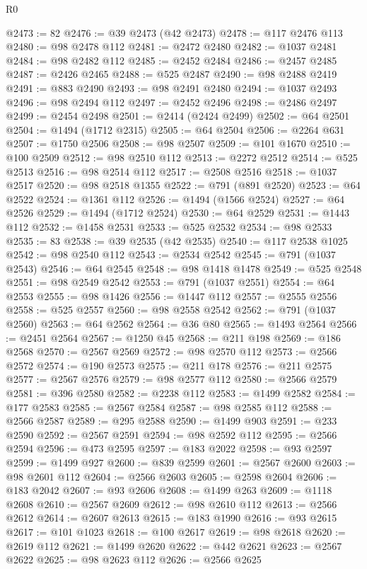 \begin{lexlean}{R0}
\begin{coremodule}
@2473 := 82
@2476 := @39 @2473 (@42 @2473)
@2478 := @117 @2476 @113
@2480 := @98 @2478 @112
@2481 := @2472 @2480
@2482 := @1037 @2481
@2484 := @98 @2482 @112
@2485 := @2452 @2484
@2486 := @2457 @2485
@2487 := @2426 @2465
@2488 := @525 @2487
@2490 := @98 @2488 @2419
@2491 := @883 @2490
@2493 := @98 @2491 @2480
@2494 := @1037 @2493
@2496 := @98 @2494 @112
@2497 := @2452 @2496
@2498 := @2486 @2497
@2499 := @2454 @2498
@2501 := @2414 (@2424 @2499)
@2502 := @64 @2501
@2504 := @1494 (@1712 @2315)
@2505 := @64 @2504
@2506 := @2264 @631
@2507 := @1750 @2506
@2508 := @98 @2507
@2509 := @101 @1670
@2510 := @100 @2509
@2512 := @98 @2510 @112
@2513 := @2272 @2512
@2514 := @525 @2513
@2516 := @98 @2514 @112
@2517 := @2508 @2516
@2518 := @1037 @2517
@2520 := @98 @2518 @1355
@2522 := @791 (@891 @2520)
@2523 := @64 @2522
@2524 := @1361 @112
@2526 := @1494 (@1566 @2524)
@2527 := @64 @2526
@2529 := @1494 (@1712 @2524)
@2530 := @64 @2529
@2531 := @1443 @112
@2532 := @1458 @2531
@2533 := @525 @2532
@2534 := @98 @2533
@2535 := 83
@2538 := @39 @2535 (@42 @2535)
@2540 := @117 @2538 @1025
@2542 := @98 @2540 @112
@2543 := @2534 @2542
@2545 := @791 (@1037 @2543)
@2546 := @64 @2545
@2548 := @98 @1418 @1478
@2549 := @525 @2548
@2551 := @98 @2549 @2542
@2553 := @791 (@1037 @2551)
@2554 := @64 @2553
@2555 := @98 @1426
@2556 := @1447 @112
@2557 := @2555 @2556
@2558 := @525 @2557
@2560 := @98 @2558 @2542
@2562 := @791 (@1037 @2560)
@2563 := @64 @2562
@2564 := @36 @80
@2565 := @1493 @2564
@2566 := @2451 @2564
@2567 := @1250 @45
@2568 := @211 @198
@2569 := @186 @2568
@2570 := @2567 @2569
@2572 := @98 @2570 @112
@2573 := @2566 @2572
@2574 := @190 @2573
@2575 := @211 @178
@2576 := @211 @2575
@2577 := @2567 @2576
@2579 := @98 @2577 @112
@2580 := @2566 @2579
@2581 := @396 @2580
@2582 := @2238 @112
@2583 := @1499 @2582
@2584 := @177 @2583
@2585 := @2567 @2584
@2587 := @98 @2585 @112
@2588 := @2566 @2587
@2589 := @295 @2588
@2590 := @1499 @903
@2591 := @233 @2590
@2592 := @2567 @2591
@2594 := @98 @2592 @112
@2595 := @2566 @2594
@2596 := @473 @2595
@2597 := @183 @2022
@2598 := @93 @2597
@2599 := @1499 @927
@2600 := @839 @2599
@2601 := @2567 @2600
@2603 := @98 @2601 @112
@2604 := @2566 @2603
@2605 := @2598 @2604
@2606 := @183 @2042
@2607 := @93 @2606
@2608 := @1499 @263
@2609 := @1118 @2608
@2610 := @2567 @2609
@2612 := @98 @2610 @112
@2613 := @2566 @2612
@2614 := @2607 @2613
@2615 := @183 @1990
@2616 := @93 @2615
@2617 := @101 @1023
@2618 := @100 @2617
@2619 := @98 @2618
@2620 := @2619 @112
@2621 := @1499 @2620
@2622 := @442 @2621
@2623 := @2567 @2622
@2625 := @98 @2623 @112
@2626 := @2566 @2625

\end{coremodule}
\end{lexlean}

